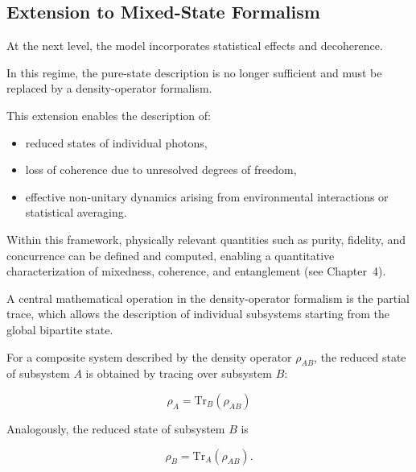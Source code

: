 
\subsection{Extension to Mixed-State Formalism}

At the next level, the model incorporates statistical effects and decoherence.

In this regime, the pure-state description is no longer sufficient and must be replaced by a density-operator formalism.

\medskip

This extension enables the description of:
\begin{itemize}
\item reduced states of individual photons,
\item loss of coherence due to unresolved degrees of freedom,
\item effective non-unitary dynamics arising from environmental interactions or statistical averaging.
\end{itemize}

\medskip

Within this framework, physically relevant quantities such as purity, fidelity, and concurrence can be defined and computed, enabling a quantitative characterization of mixedness, coherence, and entanglement (see Chapter~4).

\medskip

A central mathematical operation in the density-operator formalism is the partial trace, which allows the description of individual subsystems starting from the global bipartite state.

For a composite system described by the density operator \( \rho_{AB} \), the reduced state of subsystem \( A \) is obtained by tracing over subsystem \( B \):

\begin{equation}
\rho_A
=
\mathrm{Tr}_B(\rho_{AB})
\label{eq:partial_trace_A}
\end{equation}

\medskip

Analogously, the reduced state of subsystem \( B \) is

\begin{equation}
\rho_B
=
\mathrm{Tr}_A(\rho_{AB}).
\label{eq:partial_trace_B}
\end{equation}

